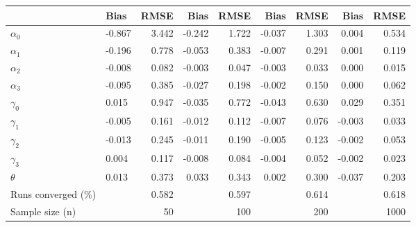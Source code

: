 
\begin{tabular}[t]{llrrrrrrr}
\toprule
  & Bias & RMSE & Bias & RMSE & Bias & RMSE & Bias & RMSE\\
\midrule
$\alpha_{0}$ & -0.867 & 3.442 & -0.242 & 1.722 & -0.037 & 1.303 & 0.004 & 0.534\\
$\alpha_{1}$ & -0.196 & 0.778 & -0.053 & 0.383 & -0.007 & 0.291 & 0.001 & 0.119\\
$\alpha_{2}$ & -0.008 & 0.082 & -0.003 & 0.047 & -0.003 & 0.033 & 0.000 & 0.015\\
$\alpha_{3}$ & -0.095 & 0.385 & -0.027 & 0.198 & -0.002 & 0.150 & 0.000 & 0.062\\
$\gamma_{0}$ & 0.015 & 0.947 & -0.035 & 0.772 & -0.043 & 0.630 & 0.029 & 0.351\\
$\gamma_{1}$ & -0.005 & 0.161 & -0.012 & 0.112 & -0.007 & 0.076 & -0.003 & 0.033\\
$\gamma_{2}$ & -0.013 & 0.245 & -0.011 & 0.190 & -0.005 & 0.123 & -0.002 & 0.053\\
$\gamma_{3}$ & 0.004 & 0.117 & -0.008 & 0.084 & -0.004 & 0.052 & -0.002 & 0.023\\
$\theta$ & 0.013 & 0.373 & 0.033 & 0.343 & 0.002 & 0.300 & -0.037 & 0.203\\
Runs converged (\%) &  & 0.582 &  & 0.597 &  & 0.614 &  & 0.618\\
Sample size (n) &  & 50 &  & 100 &  & 200 &  & 1000\\
\bottomrule
\end{tabular}
